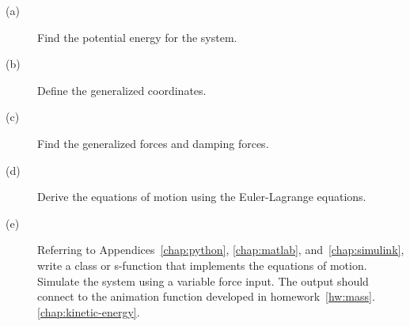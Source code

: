     \begin{description}
    \item[(a)] Find the potential energy for the system.
    \item[(b)] Define the generalized coordinates.
    \item[(c)] Find the generalized forces and damping forces.
    \item[(d)] Derive the equations of motion using the Euler-Lagrange equations.
    \item[(e)] Referring to Appendices~\ref{chap:python}, \ref{chap:matlab}, and~\ref{chap:simulink}, write a class or s-function that implements the equations of motion.  Simulate the system using a variable force input.  The output should connect to the animation function developed in homework~\ref{hw:mass}.\ref{chap:kinetic-energy}.
    \end{description}
